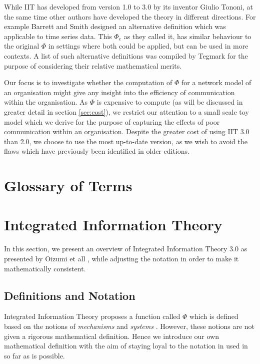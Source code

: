 While IIT has developed from version 1.0 to 3.0 by its inventor Giulio Tononi, at the same time other authors have developed the theory in different directions. For example Barrett and Smith \cite{barrett2011practical} designed an alternative definition which was applicable to time series data. This $\Phi_e$ as they called it, has similar behaviour to the original $\Phi$ in settings where both could be applied, but can be used in more contexts. A list of such alternative definitions was compiled by Tegmark \cite{tegmark2016improved} for the purpose of considering their relative mathematical merits.

Our focus is to investigate whether the computation of $\Phi$ for a network model of an organisation might give any insight into the efficiency of communication within the organisation. As $\Phi$ is expensive to compute (as will be discussed in greater detail in section \ref{sec:cost}), we restrict our attention to a small scale toy model which we derive for the purpose of capturing the effects of poor communication within an organisation. Despite the greater cost of using IIT 3.0 than 2.0, we choose to use the most up-to-date version, as we wish to avoid the flaws which have previously been identified in older editions.


\section{Glossary of Terms}

\section{Integrated Information Theory}
\label{sec:iit}

In this section, we present an overview of Integrated Information Theory 3.0 as presented by Oizumi et all \cite{oizumi2014phenomenology}, while adjusting the notation in order to make it mathematically consistent.
	
\subsection{Definitions and Notation}

Integrated Information Theory proposes a function called $\Phi$ which is defined based on the notions of \textit{mechanisms} and \textit{systems} \cite{oizumi2014phenomenology}. However, these notions are not given a rigorous mathematical definition. Hence we introduce our own mathematical definition with the aim of staying loyal to the notation in used in \cite{krohn2016computing} so far as is possible.

